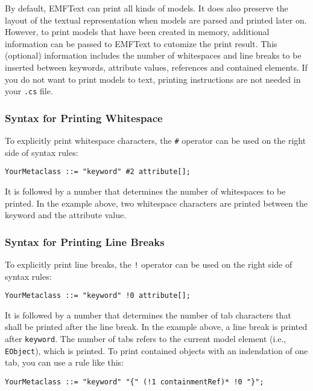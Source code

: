 By default, EMFText can print all kinds of models. It does also preserve the
layout of the textual representation when models are parsed and printed later
on. However, to print models that have been created in memory, additional
information can be passed to EMFText to cutomize the print result. This
(optional) information includes the number of whitespaces and line breaks to be
inserted between keywords, attribute values, references and contained elements. 
If you do not want to print models to text, printing instructions are not needed 
in your \texttt{.cs} file.

\subsubsection{Syntax for Printing Whitespace}

To explicitly print whitespace characters, the \texttt{\#} operator can be used
on the right side of syntax rules:

\lstset{language=CS}
\begin{lstlisting}
YourMetaclass ::= "keyword" #2 attribute[];
\end{lstlisting}

It is followed by a number that determines the number of whitespaces to be
printed. In the example above, two whitespace characters are printed between the
keyword and the attribute value.

\subsubsection{Syntax for Printing Line Breaks}

To explicitly print line breaks, the \texttt{!} operator can be used on the
right side of syntax rules:

\lstset{language=CS}
\begin{lstlisting}
YourMetaclass ::= "keyword" !0 attribute[];
\end{lstlisting}

It is followed by a number that determines the number of tab characters that
shall be printed after the line break. In the example above, a line break
is printed after \texttt{keyword}. The number of tabs refers to the current
model element (i.e., \texttt{EObject}), which is printed. To print contained
objects with an indendation of one tab, you can use a rule like this:

\lstset{language=CS}
\begin{lstlisting}
YourMetaclass ::= "keyword" "{" (!1 containmentRef)* !0 "}";
\end{lstlisting}

